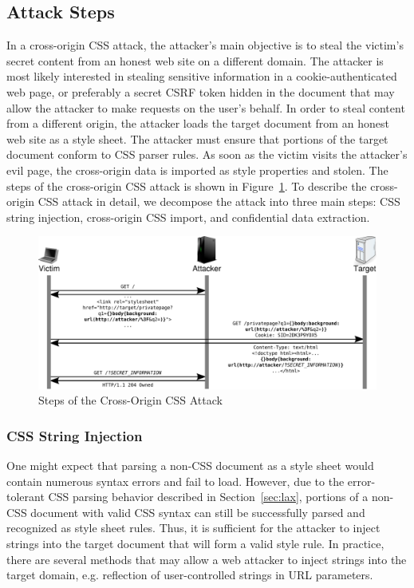 \documentclass{acm_proc_article-sp}
\begin{document}
\subsection{Attack Steps}
In a cross-origin CSS attack, the attacker's main objective is to steal the victim's secret content from an honest web site on a different domain. The attacker is most likely interested in stealing sensitive information in a cookie-authenticated web page, or preferably a secret CSRF token hidden in the document that may allow the attacker to make requests on the user's behalf. In order to steal content from a different origin, the attacker loads the target document from an honest web site as a style sheet. The attacker must ensure that portions of the target document conform to CSS parser rules. As soon as the victim visits the attacker's evil page, the cross-origin data is imported as style properties and stolen. The steps of the cross-origin CSS attack is shown in Figure~\ref{figure:steps}. To describe the cross-origin CSS attack in detail, we decompose the attack into three main steps: CSS string injection, cross-origin CSS import, and confidential data extraction.

\begin{figure}
\centering
\includegraphics[width=\linewidth]{steps}
\caption{Steps of the Cross-Origin CSS Attack}
\label{figure:steps}
\end{figure}

\subsubsection{CSS String Injection}
One might expect that parsing a non-CSS document as a style sheet would contain numerous syntax errors and fail to load. However, due to the error-tolerant CSS parsing behavior described in Section~\ref{sec:lax}, portions of a non-CSS document with valid CSS syntax can still be successfully parsed and recognized as style sheet rules. Thus, it is sufficient for the attacker to inject strings into the target document that will form a valid style rule. In practice, there are several methods that may allow a web attacker to inject strings into the target domain, e.g. reflection of user-controlled strings in URL parameters.
\end{document}
